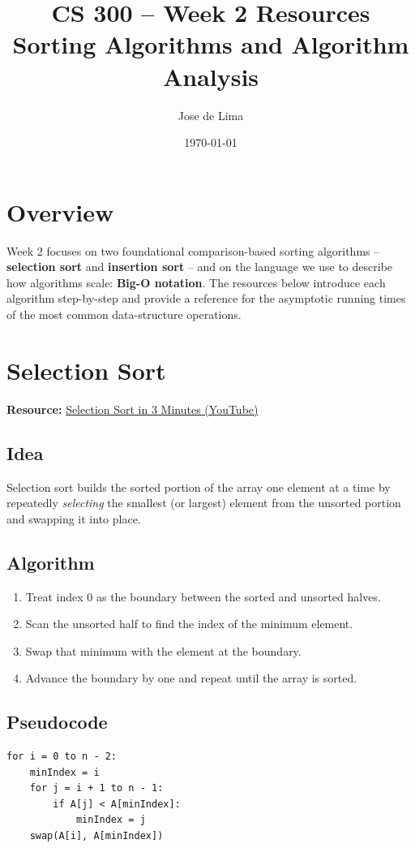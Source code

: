 \documentclass[11pt]{article}
\title{CS 300 -- Week 2 Resources\\\large Sorting Algorithms and Algorithm Analysis}
\author{Jose de Lima}
\date{\today}
\begin{document}
\maketitle

\section*{Overview}
Week 2 focuses on two foundational comparison-based sorting algorithms --
\textbf{selection sort} and \textbf{insertion sort} -- and on the language we
use to describe how algorithms scale: \textbf{Big-O notation}. The resources
below introduce each algorithm step-by-step and provide a reference for the
asymptotic running times of the most common data-structure operations.

\section{Selection Sort}
\textbf{Resource:} \href{https://www.youtube.com/watch?v=g-PGLbMth_g}{Selection Sort in 3 Minutes (YouTube)}

\subsection*{Idea}
Selection sort builds the sorted portion of the array one element at a time by
repeatedly \emph{selecting} the smallest (or largest) element from the
unsorted portion and swapping it into place.

\subsection*{Algorithm}
\begin{enumerate}[leftmargin=*]
    \item Treat index $0$ as the boundary between the sorted and unsorted halves.
    \item Scan the unsorted half to find the index of the minimum element.
    \item Swap that minimum with the element at the boundary.
    \item Advance the boundary by one and repeat until the array is sorted.
\end{enumerate}

\subsection*{Pseudocode}
\begin{lstlisting}[basicstyle=\ttfamily\small,frame=single]
for i = 0 to n - 2:
    minIndex = i
    for j = i + 1 to n - 1:
        if A[j] < A[minIndex]:
            minIndex = j
    swap(A[i], A[minIndex])
\end{lstlisting}
\end{document}
